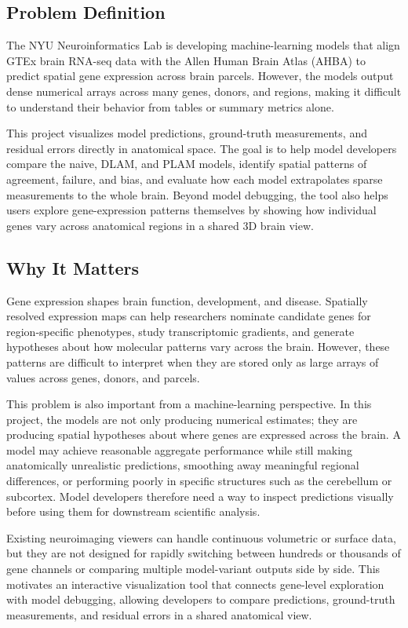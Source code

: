\documentclass[11pt,letterpaper]{article}
\begin{document}
\subsection{Problem Definition}

The NYU Neuroinformatics Lab is developing machine-learning models that align
GTEx brain RNA-seq data with the Allen Human Brain Atlas (AHBA) to predict
spatial gene expression across brain parcels.
However, the models output dense numerical arrays across many genes, donors,
and regions, making it difficult to understand their behavior from tables or
summary metrics alone.

This project visualizes model predictions, ground-truth measurements, and
residual errors directly in anatomical space.
The goal is to help model developers compare the naive, DLAM, and PLAM models,
identify spatial patterns of agreement, failure, and bias, and evaluate how each
model extrapolates sparse measurements to the whole brain.
Beyond model debugging, the tool also helps users explore gene-expression
patterns themselves by showing how individual genes vary across anatomical
regions in a shared 3D brain view.
\subsection{Why It Matters}

Gene expression shapes brain function, development, and disease.
Spatially resolved expression maps can help researchers nominate candidate
genes for region-specific phenotypes, study transcriptomic gradients, and
generate hypotheses about how molecular patterns vary across the brain.
However, these patterns are difficult to interpret when they are stored only as
large arrays of values across genes, donors, and parcels.

This problem is also important from a machine-learning perspective.
In this project, the models are not only producing numerical estimates; they are
producing spatial hypotheses about where genes are expressed across the brain.
A model may achieve reasonable aggregate performance while still making
anatomically unrealistic predictions, smoothing away meaningful regional
differences, or performing poorly in specific structures such as the cerebellum
or subcortex.
Model developers therefore need a way to inspect predictions visually before
using them for downstream scientific analysis.

Existing neuroimaging viewers can handle continuous volumetric or surface data,
but they are not designed for rapidly switching between hundreds or thousands
of gene channels or comparing multiple model-variant outputs side by side.
This motivates an interactive visualization tool that connects gene-level
exploration with model debugging, allowing developers to compare predictions,
ground-truth measurements, and residual errors in a shared anatomical view.
\end{document}
